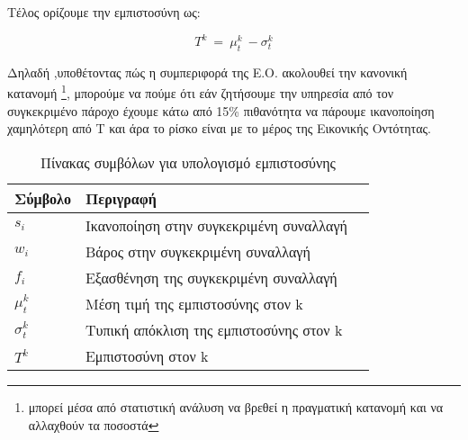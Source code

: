 Τέλος ορίζουμε την εμπιστοσύνη ως:

\begin{equation}\label{eq:trust}
 T^k \ = \ \mu_t^k \ - \sigma_t^k 
\end{equation}

Δηλαδή ,υποθέτοντας πώς η συμπεριφορά της Ε.Ο. ακολουθεί την κανονική κατανομή \footnote{μπορεί μέσα από στατιστική ανάλυση να βρεθεί η πραγματική κατανομή και να αλλαχθούν τα ποσοστά}, μπορούμε να πούμε ότι εάν ζητήσουμε την υπηρεσία από τον συγκεκριμένο πάροχο έχουμε κάτω από 15\% πιθανότητα να πάρουμε ικανοποίηση χαμηλότερη από Τ και άρα το ρίσκο είναι με το μέρος της Εικονικής Οντότητας.

\begin{table}[H]
    \centering
    \begin{tabular}{ | l | l | l | }
        \hline
        Σύμβολο & Περιγραφή \\ \hline \hline
        $s_i$ & Ικανοποίηση στην συγκεκριμένη συναλλαγή  \\ \hline
        $w_i$ & Βάρος στην συγκεκριμένη συναλλαγή  \\ \hline
        $f_i$ & Εξασθένηση της συγκεκριμένη συναλλαγή  \\ \hline
        $\mu_t^k$ 	& Μέση τιμή της εμπιστοσύνης στον k\\ \hline
        $\sigma_t^k$    & Τυπική απόκλιση της εμπιστοσύνης στον k \\ \hline
        $T^k$   & Εμπιστοσύνη στον k \\ \hline
            \end{tabular}
    \caption{Πίνακας συμβόλων για υπολογισμό εμπιστοσύνης}
    \label{tab:symbols_trust}
\end{table}
\newpage
